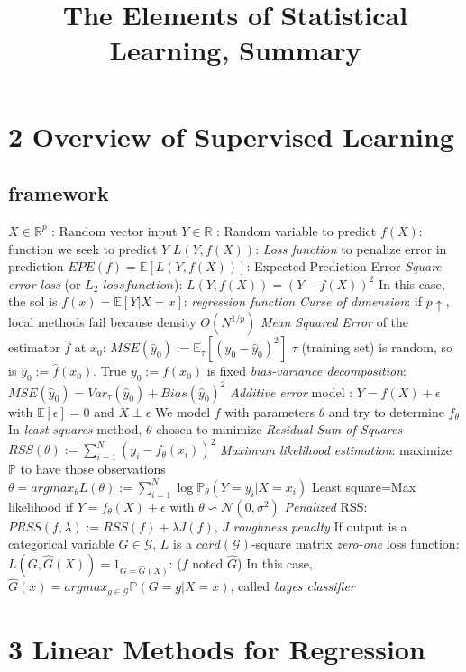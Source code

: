 \documentclass[9pt]{extarticle}
\title{The Elements of Statistical Learning, Summary}
\date{}
\begin{document}
\maketitle
\vspace{-15ex}
\begin{multicols*}{2}

\newcommand\E{\mathbb{E}}
\newcommand\Proba{\mathbb{P}}
\newcommand{\nl}{\newline}
\newcommand{\N}{\mathcal{N}}

\section*{2 Overview of Supervised Learning}

\subsection*{framework}

$X \in \mathbb{R}^p$ : Random vector input\nl
$Y \in \mathbb{R}$ : Random variable to predict\nl
$f(X)$: function we seek to predict $Y$\nl
$L(Y,f(X))$: \textit{Loss function} to penalize error in prediction\nl
$EPE(f)=\E[L(Y,f(X))]$: Expected Prediction Error\nl
\emph{Square error loss} (or \emph{$L_2$ $loss function$}): $L(Y,f(X))=(Y-f(X))^2$\nl
In this case, the sol is $f(x)=\E[Y|X=x]$: \emph{regression function}\nl
\emph{Curse of dimension}: if $p\uparrow$, local methods fail because density $O(N^{1/p})$\nl
\emph{Mean Squared Error} of the estimator $\hat{f}$ at $x_0$:
$MSE(\hat{y}_0):=\E_{\tau}[(y_0-\hat{y}_0)^2]$\nl
$\tau$ (training set) is random, so is $\hat{y}_0:=\hat{f}(x_0)$. True $y_0:=f(x_0)$ is fixed\nl
\emph{bias-variance decomposition}: $MSE(\hat{y}_0)=Var_{\tau}(\hat{y}_0)+Bias(\hat{y}_0)^2$\nl
\emph{Additive error} model : $Y=f(X)+\epsilon$ with $\E[\epsilon]=0$ and $X\perp \epsilon$\nl
We model $f$ with parameters $\theta$ and try to determine $f_{\theta}$\nl
In \emph{least squares} method, $\theta$ chosen to minimize \emph{Residual Sum of Squares}\nl
$RSS(\theta):=\sum_{i=1}^{N}(y_i-f_{\theta}(x_i))^2$\nl
\emph{Maximum likelihood estimation}: maximize $\Proba$ to have those observations\nl
$\theta=argmax_{\theta} L(\theta):=\sum_{i=1}^{N}\log \Proba_{\theta}(Y=y_i|X=x_i)$\nl
Least square=Max likelihood if $Y=f_{\theta}(X)+\epsilon$ with $\theta \backsim \N(0,\sigma^2)$\nl
\emph{Penalized} RSS: $PRSS(f,\lambda):=RSS(f)+\lambda J(f)$, $J$ \emph{roughness penalty}\nl
If output is a categorical variable $G \in \mathcal{G}$, $L$ is a $card(\mathcal{G})$-square matrix\nl
\textit{zero-one} loss function: $L(G,\hat{G}(X))=1_{G=\hat{G}(X)}$:  ($f$ noted $\hat{G}$)\nl
In this case, $\hat{G}(x)=argmax_{g \in \mathcal{G}} \Proba(G=g|X=x)$, called \textit{bayes classifier}



\section{3 Linear Methods for Regression}


\end{multicols*}
\end{document}
